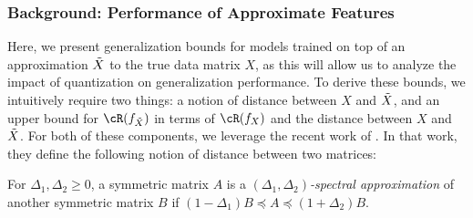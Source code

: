 \subsubsection{Background: Performance of Approximate Features}
Here, we present generalization bounds for models trained on top of an approximation $\tX$ to the true data matrix $X$, as this will allow us to analyze the impact of quantization on generalization performance.
To derive these bounds, we intuitively require two things: a notion of distance between $X$ and $\tX$, and an upper bound for $\cR(f_{\tX})$ in terms of $\cR(f_X)$ and the distance between $X$ and $\tX$.
For both of these components, we leverage the recent work of \citep{lprff18}.
In that work, they define the following notion of distance between two matrices:

\begin{definition}{\citep{lprff18}}
	\label{def:specdist}
	For $\Delta_1, \Delta_2 \geq 0$, a symmetric matrix $A$ is a \emph{$(\Delta_1, \Delta_2)$-spectral approximation} of another symmetric matrix $B$ if $(1-\Delta_1)B \preceq A \preceq (1+\Delta_2)B$. 
\end{definition}


